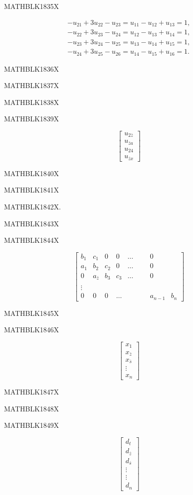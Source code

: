 \documentclass[
]{article}
\begin{document}
MATHBLK1835X

\[
\begin{aligned} -u_{21}+3u_{22}-u_{23}=u_{11}-u_{12}+u_{13}=1,\\ -u_{22}+3u_{23}-u_{24}=u_{12}-u_{13}+u_{14}=1,\\ -u_{23}+3u_{24}-u_{25}=u_{13}-u_{14}+u_{15}=1,\\ -u_{24}+3u_{25}-u_{26}=u_{14}-u_{15}+u_{16}=1. \end{aligned}
\]

MATHBLK1836X

MATHBLK1837X

MATHBLK1838X

MATHBLK1839X

\[
\begin{bmatrix} u_{2\bar{z}} \\ u_{\bar{z}a} \\ u_{24} \\ u_{\bar{z}x} \end{bmatrix}
\]

MATHBLK1840X

MATHBLK1841X

MATHBLK1842X.

MATHBLK1843X

MATHBLK1844X

\[
\begin{bmatrix} b_1 & c_1 & 0 & 0 & \dots & & & 0 \\ a_1 & b_2 & c_2 & 0 & \dots & & & 0 \\ 0 & a_{\bar{z}} & b_3 & c_3 & \dots & & & 0 \\ & & & & & & & & \\ \vdots & & & & & & & & \\ 0 & 0 & 0 & \dots & & & & a_{n-1} & b_n \end{bmatrix}
\]

MATHBLK1845X

MATHBLK1846X

\[
\begin{bmatrix} x_1 \\ x_{\bar{z}} \\ x_{\bar{s}} \\ \vdots \\ x_n \end{bmatrix}
\]

MATHBLK1847X

MATHBLK1848X

MATHBLK1849X

\[
\begin{bmatrix} d_t \\ d_{\bar{z}} \\ d_{\bar{s}} \\ \vdots \\ \vdots \\ d_n \end{bmatrix}
\]
\end{document}
